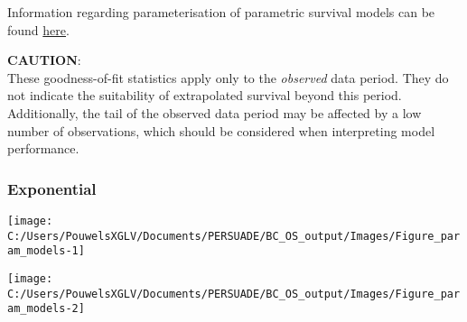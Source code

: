 \documentclass[
]{article}
\begin{document}
Information regarding parameterisation of parametric survival models can
be found
\href{https://devinincerti.com/code/survival-distributions.html}{here}.

\textbf{CAUTION}:\\
These goodness-of-fit statistics apply only to the \emph{observed} data
period. They do not indicate the suitability of extrapolated survival
beyond this period. Additionally, the tail of the observed data period
may be affected by a low number of observations, which should be
considered when interpreting model performance.

\clearpage

\begin{table}[H]
\centering
\caption{\label{tab:Table_2}Goodness of fit statistics}
\centering
{}
\end{table}

\clearpage

\clearpage

\subsubsection{Exponential}\label{exponential}

\begin{flushleft}\texttt{[image: C:/Users/PouwelsXGLV/Documents/PERSUADE/BC\_OS\_output/Images/Figure\_param\_models-1]} \end{flushleft}

\begin{flushleft}\texttt{[image: C:/Users/PouwelsXGLV/Documents/PERSUADE/BC\_OS\_output/Images/Figure\_param\_models-2]} \end{flushleft}
\end{document}
